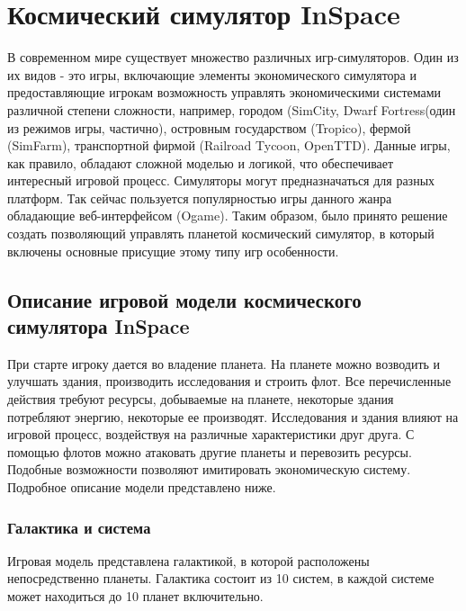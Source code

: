 





\tableofcontents
\newpage



\section{Космический симулятор InSpace}
\label{descr}
В современном мире существует множество различных игр-симуляторов. Один из их видов - это игры, включающие элементы экономического симулятора и предоставляющие игрокам возможность управлять экономическими системами различной степени сложности, например, городом (SimCity, Dwarf Fortress(один из режимов игры, частично), островным государством (Tropico), фермой (SimFarm), транспортной фирмой (Railroad Tycoon, OpenTTD). Данные игры, как правило, обладают сложной моделью и логикой, что обеспечивает интересный игровой процесс. Симуляторы могут предназначаться для разных платформ. Так сейчас пользуется популярностью игры данного жанра обладающие веб-интерфейсом (Ogame). Таким образом, было принято решение создать позволяющий управлять планетой космический симулятор, в который включены основные присущие этому типу игр особенности. 

\subsection{Описание игровой модели космического симулятора InSpace}

При старте игроку дается во владение планета. На планете можно возводить и улучшать здания, производить исследования и строить флот. Все перечисленные действия требуют ресурсы, добываемые на планете, некоторые здания потребляют энергию, некоторые ее производят. Исследования и здания влияют на игровой процесс, воздействуя на различные характеристики друг друга. С помощью флотов можно атаковать другие планеты и перевозить ресурсы. Подобные возможности позволяют имитировать экономическую систему. Подробное описание модели представлено ниже.

\subsubsection{Галактика и система}
Игровая модель представлена галактикой, в которой расположены непосредственно планеты. Галактика состоит из 10 систем, в каждой системе может находиться до 10 планет включительно.	

